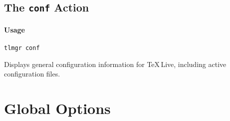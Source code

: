 \documentclass[11pt]{article}
\begin{document}
\clearpage

\subsection{The {\tt conf} Action}
\label{conf}
\paragraph{Usage}
\begin{list}{}{}
\item \texttt{tlmgr conf}
\end{list}

Displays general configuration information for \TeX\,Live, including active configuration files.

\clearpage

\clearpage
\section{Global Options}
\label{GlobalOptions}
\end{document}
